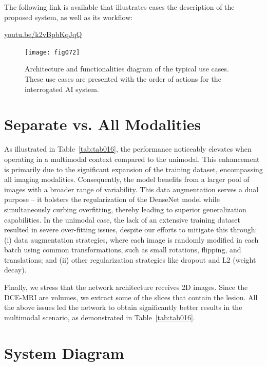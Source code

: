 
\noindent
The following link is available that illustrates eases the description of the proposed system, as well as its workflow:

\vspace{2mm}

\noindent
\href{https://youtu.be/k2vBpbKqJqQ}{youtu.be/k2vBpbKqJqQ}

\begin{figure}[htbp]
\centering
\texttt{[image: fig072]}
\caption{Architecture and functionalities diagram of the typical use cases. These use cases are presented with the order of actions for the interrogated AI system.}
\label{fig:fig072}
\end{figure}

\section{Separate vs. All Modalities}
\label{sec:app004008}

As illustrated in Table~\ref{tab:tab016}, the performance noticeably elevates when operating in a multimodal context compared to the unimodal.
This enhancement is primarily due to the significant expansion of the training dataset, encompassing all imaging modalities.
Consequently, the model benefits from a larger pool of images with a broader range of variability.
This data augmentation serves a dual purpose -- it bolsters the regularization of the DenseNet model while simultaneously curbing overfitting, thereby leading to superior generalization capabilities.
In the unimodal case, the lack of an extensive training dataset resulted in severe over-fitting issues, despite our efforts to mitigate this through:
(i) data augmentation strategies, where each image is randomly modified in each batch using common transformations, such as small rotations, flipping, and translations; and
(ii) other regularization strategies like dropout and L2 (weight decay).

Finally, we stress that the network architecture receives 2D images.
Since the \ac{DCE-MRI} are volumes, we extract some of the slices that contain the lesion.
All the above issues led the network to obtain significantly better results in the multimodal scenario, as demonstrated in Table~\ref{tab:tab016}.

\section{System Diagram}
\label{sec:app004009}

